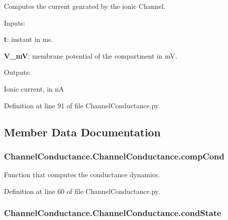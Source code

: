 Computes the current genrated by the ionic Channel. 


\begin{DoxyItemize}
\item Inputs\-:
\begin{DoxyItemize}
\item {\bfseries t}\-: instant in ms.
\item {\bfseries V\-\_\-m\-V}\-: membrane potential of the compartment in m\-V.
\end{DoxyItemize}
\item Outputs\-:
\begin{DoxyItemize}
\item Ionic current, in n\-A 
\end{DoxyItemize}
\end{DoxyItemize}

Definition at line 91 of file Channel\-Conductance.\-py.



\subsection{Member Data Documentation}
\hypertarget{class_channel_conductance_1_1_channel_conductance_a0a91eec3fa2b1dfc66c6379943a5907f}{
\subsubsection[{comp\-Cond}]{\setlength{\rightskip}{0pt plus 5cm}Channel\-Conductance.\-Channel\-Conductance.\-comp\-Cond}}\label{class_channel_conductance_1_1_channel_conductance_a0a91eec3fa2b1dfc66c6379943a5907f}


Function that computes the conductance dynamics. 



Definition at line 60 of file Channel\-Conductance.\-py.

\hypertarget{class_channel_conductance_1_1_channel_conductance_a628553cbc1efd93b30b0a15afd4417d9}{
\subsubsection[{cond\-State}]{\setlength{\rightskip}{0pt plus 5cm}Channel\-Conductance.\-Channel\-Conductance.\-cond\-State}}\label{class_channel_conductance_1_1_channel_conductance_a628553cbc1efd93b30b0a15afd4417d9}


